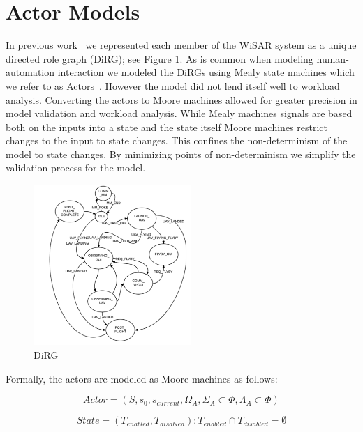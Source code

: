 \section{Actor Models} 

In previous work~\cite{gledhill2013modelinguas} we represented each member of the WiSAR system as a unique directed role graph (DiRG); see Figure 1. As is common
when modeling human-automation interaction we modeled the DiRGs using Mealy state machines which we refer to as Actors~\cite{bolton2013litreview}. However the model did not lend itself well to workload analysis. Converting the actors to Moore machines allowed for greater precision in model validation and workload analysis. While Mealy machines signals are based both on the inputs into a state and the state itself Moore machines restrict changes to the input to state changes. This confines the non-determinism of the model to state changes. By minimizing points of non-determinism we simplify the validation process for the model.

\begin{figure}[h]
\center
\setlength{\abovecaptionskip}{1mm}
\setlength{\belowcaptionskip}{1mm}
\setlength{\textfloatsep}{1mm}
\setlength{\floatsep}{1mm}
\includegraphics[height=2.4in]{DiRG.png}
\caption{DiRG}
\label{fig:dirg}
\end{figure}

Formally, the actors are modeled as Moore machines as follows:

\begin{equation}
 	Actor = (S, s_0, s_{current}, \Omega_A, \Sigma_A \subset \Phi, \Lambda_A
 	\subset \Phi)
 \label{eq:actor}
 \end{equation}

 \begin{equation}
	State = (T_{enabled}, T_{disabled}) : T_{enabled} \cap T_{disabled} = \emptyset
 \label{eq:state}
\end{equation}

